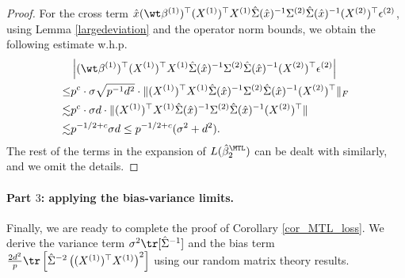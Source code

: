\documentclass[aos,preprint]{imsart}
\begin{document}
\begin{proof}
For the cross term $\hat x (\wt \beta^{(1)})^\top (X^{(1)})^\top X^{(1)} \hat \Sigma(\hat x)^{-1}  \Sigma^{(2)} \hat \Sigma(\hat x)^{-1}  (X^{(2)})^\top  \epsilon^{(2)}$, using Lemma \ref{largedeviation} and the operator norm bounds, we obtain the following estimate w.h.p.
\begin{align*}
& \left| (\wt \beta^{(1)})^\top (X^{(1)})^\top X^{(1)} \hat \Sigma(\hat x)^{-1}  \Sigma^{(2)} \hat \Sigma(\hat x)^{-1}  (X^{(2)})^\top  \epsilon^{(2)}\right|  \\
  \le & p^c \cdot \sigma\sqrt{p^{-1}d^2} \cdot \|(X^{(1)})^\top X^{(1)} \hat \Sigma(\hat x)^{-1}  \Sigma^{(2)} \hat \Sigma(\hat x)^{-1}  (X^{(2)})^\top  \|_F \\
 \lesssim & p^{c}\cdot \sigma d \cdot  \|(X^{(1)})^\top X^{(1)} \hat \Sigma(\hat x)^{-1}  \Sigma^{(2)} \hat \Sigma(\hat x)^{-1}  (X^{(2)})^\top  \| \\
 \lesssim & p^{-1/2+c}\sigma d\le p^{-1/2+c}(\sigma^2+ d^2).
\end{align*}
The rest of the terms in the expansion of $L(\hat{\beta}_2^{\MTL})$ can be dealt with similarly, and we omit the details.
 \end{proof}

  
\paragraph{Part $3$: applying the bias-variance limits.}
Finally, we are ready to complete the proof of Corollary \ref{cor_MTL_loss}.
We derive the variance term $\sigma^2  \tr[\hat\Sigma^{-1}]$ and the bias term $\frac{2d^2}{p} \tr\left[\hat\Sigma^{-2} \left((X^{(1)})^\top X^{(1)} \right)^2\right]$ using our random matrix theory results.
\end{document}

